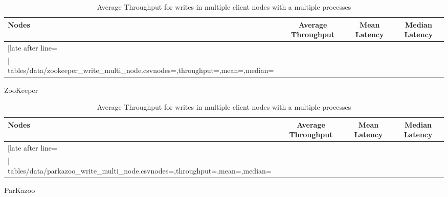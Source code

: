 \begin{table}[ht!]
	\begin{subtable}[t]{1.0\linewidth}
		\centering
		\begin{tabular}{|l|c|c|c|}\hline%
			\textbf{Nodes}   & \textbf{Average Throughput} & \textbf{Mean Latency} & \textbf{Median Latency} \\\hline
			\csvreader[late after line=\\\hline]%
			{tables/data/zookeeper_write_multi_node.csv}{nodes=\nodes,throughput=\throughput,mean=\mean,median=\median}%
			{\nodes & \throughput & \mean & \median}%
		\end{tabular}
		\caption{ZooKeeper}
		\label{table:zookeeper_multinode_throughput}
	\end{subtable}
	\begin{subtable}[t]{1.0\linewidth}
		\centering
		\begin{tabular}{|l|c|c|c|}\hline%
			\textbf{Nodes}   & \textbf{Average Throughput} & \textbf{Mean Latency} & \textbf{Median Latency}\\\hline
			\csvreader[late after line=\\\hline]%
			{tables/data/parkazoo_write_multi_node.csv}{nodes=\nodes,throughput=\throughput,mean=\mean,median=\median}%
			{\nodes & \throughput & \mean & \median}%
		\end{tabular}
		\caption{ParKazoo}
		\label{table:parkazoo_multinode_throughput}
	\end{subtable}

	\caption{Average Throughput for writes in multiple client nodes with a multiple processes}
	\label{table:multinode_throughput_all}
\end{table}
